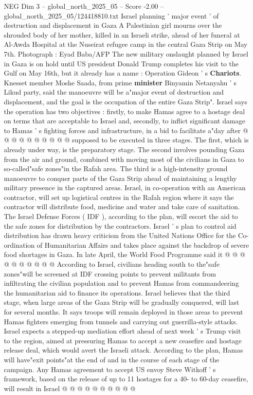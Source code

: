 \begin{textsample}{NEG Dim 3 – global\_north\_2025\_05 – Score -2.00 – global\_north\_2025\_05/124418810.txt}  \label{ex:f3_neg_308}
Israel planning ' major event ' of destruction and displacement in Gaza A Palestinian girl mourns over the shrouded body of her mother, killed in an Israeli strike, ahead of her funeral at Al-Awda Hospital at the Nuseirat refugee camp in the central Gaza Strip on May 7th.
Photograph : Eyad Baba/AFP The new military onslaught planned by Israel in Gaza is on hold until US president Donald Trump completes his visit to the Gulf on May 16th, but it already has a name : Operation Gideon ' s \textbf{Chariots}.
Knesset member Moshe Saada, from prime \textbf{minister} Binyamin Netanyahu ' s Likud party, said the manoeuvre will be a"major event of destruction and displacement, and the goal is the occupation of the entire Gaza Strip".
Israel says the operation has two objectives : firstly, to make Hamas agree to a hostage deal on terms that are acceptable to Israel and, secondly, to inflict significant damage to Hamas ' s fighting forces and infrastructure, in a bid to facilitate a"day after @ @ @ @ @ @ @ @ @ @ supposed to be executed in three stages.
The first, which is already under way, is the preparatory stage.
The second involves pounding Gaza from the air and ground, combined with moving most of the civilians in Gaza to so-called"safe zones"in the Rafah area.
The third is a high-intensity ground manoeuvre to conquer parts of the Gaza Strip ahead of maintaining a lengthy military presence in the captured areas.
Israel, in co-operation with an American contractor, will set up logistical centres in the Rafah region where it says the contractor will distribute food, medicine and water and take care of sanitation.
The Israel Defense Forces ( IDF ), according to the plan, will escort the aid to the safe zones for distribution by the contractors.
Israel ' s plan to control aid distribution has drawn heavy criticism from the United Nations Office for the Co-ordination of Humanitarian Affairs and takes place against the backdrop of severe food shortages in Gaza.
In late April, the World Food Programme said it @ @ @ @ @ @ @ @ @ @ According to Israel, civilians heading south to the"safe zones"will be screened at IDF crossing points to prevent militants from infiltrating the civilian population and to prevent Hamas from commandeering the humanitarian aid to finance its operations.
Israel believes that the third stage, when large areas of the Gaza Strip will be gradually conquered, will last for several months.
It says troops will remain deployed in those areas to prevent Hamas fighters emerging from tunnels and carrying out guerrilla-style attacks.
Israel expects a stepped-up mediation effort ahead of next week ' s Trump visit to the region, aimed at pressuring Hamas to accept a new ceasefire and hostage release deal, which would avert the Israeli attack.
According to the plan, Hamas will have"exit points"at the end of and in the course of each stage of the campaign.
Any Hamas agreement to accept US envoy Steve Witkoff ' s framework, based on the release of up to 11 hostages for a 40- to 60-day ceasefire, will result in Israel @ @ @ @ @ @ @ @ @ @

\end{textsample}
